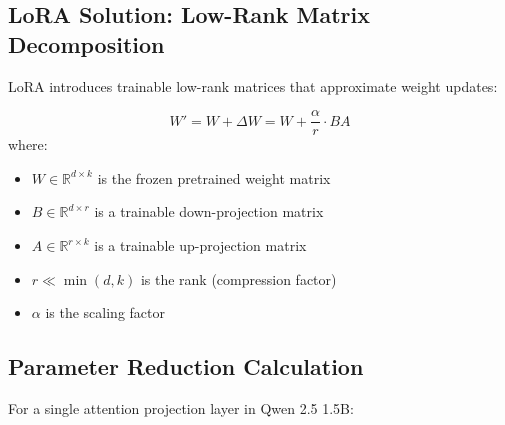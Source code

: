 \documentclass[12pt,a4paper]{article}
\begin{document}
\subsection{LoRA Solution: Low-Rank Matrix Decomposition}

LoRA introduces trainable low-rank matrices that approximate weight updates:

\begin{tcolorbox}[colback=blue!5!white,colframe=blue!75!black,title=LoRA Core Equation]
\begin{equation}
    W' = W + \Delta W = W + \frac{\alpha}{r} \cdot BA
\end{equation}
where:
\begin{itemize}
    \item $W \in \mathbb{R}^{d \times k}$ is the frozen pretrained weight matrix
    \item $B \in \mathbb{R}^{d \times r}$ is a trainable down-projection matrix
    \item $A \in \mathbb{R}^{r \times k}$ is a trainable up-projection matrix
    \item $r \ll \min(d, k)$ is the rank (compression factor)
    \item $\alpha$ is the scaling factor
\end{itemize}
\end{tcolorbox}

\subsection{Parameter Reduction Calculation}

For a single attention projection layer in Qwen 2.5 1.5B:
\end{document}
